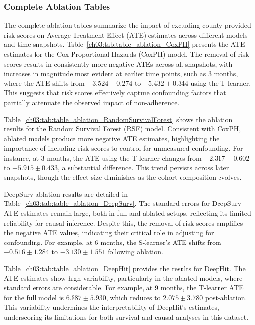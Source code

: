 








\subsubsection{Complete Ablation Tables}
\label{ch03:apd:ablation}


The complete ablation tables summarize the impact of excluding county-provided risk scores on Average Treatment Effect (ATE) estimates across different models and time snapshots.
Table~\ref{ch03:tab:table_ablation_CoxPH} presents the ATE estimates for the Cox Proportional Hazards (CoxPH) model.
The removal of risk scores results in consistently more negative ATEs across all snapshots, with increases in magnitude most evident at earlier time points, such as 3 months, where the ATE shifts from \(-3.524 \pm 0.274\) to \(-5.432 \pm 0.344\) using the T-learner.
This suggests that risk scores effectively capture confounding factors that partially attenuate the observed impact of non-adherence.

Table~\ref{ch03:tab:table_ablation_RandomSurvivalForest} shows the ablation results for the Random Survival Forest (RSF) model.
Consistent with CoxPH, ablated models produce more negative ATE estimates, highlighting the importance of including risk scores to control for unmeasured confounding.
For instance, at 3 months, the ATE using the T-learner changes from \(-2.317 \pm 0.602\) to \(-5.915 \pm 0.433\), a substantial difference.
This trend persists across later snapshots, though the effect size diminishes as the cohort composition evolves.

DeepSurv ablation results are detailed in Table~\ref{ch03:tab:table_ablation_DeepSurv}.
The standard errors for DeepSurv ATE estimates remain large, both in full and ablated setups, reflecting its limited reliability for causal inference.
Despite this, the removal of risk scores amplifies the negative ATE values, indicating their critical role in adjusting for confounding.
For example, at 6 months, the S-learner's ATE shifts from \(-0.516 \pm 1.284\) to \(-3.130 \pm 1.551\) following ablation.

Table~\ref{ch03:tab:table_ablation_DeepHit} provides the results for DeepHit.
The ATE estimates show high variability, particularly in the ablated models, where standard errors are considerable.
For example, at 9 months, the T-learner ATE for the full model is \(6.887 \pm 5.930\), which reduces to \(2.075 \pm 3.780\) post-ablation.
This variability undermines the interpretability of DeepHit's estimates, underscoring its limitations for both survival and causal analyses in this dataset.

